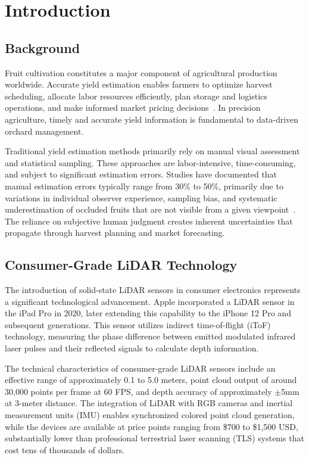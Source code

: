 \section{Introduction}

\subsection{Background}
Fruit cultivation constitutes a major component of agricultural production worldwide. Accurate yield estimation enables farmers to optimize harvest scheduling, allocate labor resources efficiently, plan storage and logistics operations, and make informed market pricing decisions~\citep{Maheswari_2021}. In precision agriculture, timely and accurate yield information is fundamental to data-driven orchard management.

Traditional yield estimation methods primarily rely on manual visual assessment and statistical sampling. These approaches are labor-intensive, time-consuming, and subject to significant estimation errors. Studies have documented that manual estimation errors typically range from 30\% to 50\%, primarily due to variations in individual observer experience, sampling bias, and systematic underestimation of occluded fruits that are not visible from a given viewpoint~\citep{Sa_2016}. The reliance on subjective human judgment creates inherent uncertainties that propagate through harvest planning and market forecasting.

\subsection{Consumer-Grade LiDAR Technology}
The introduction of solid-state LiDAR sensors in consumer electronics represents a significant technological advancement. Apple incorporated a LiDAR sensor in the iPad Pro in 2020, later extending this capability to the iPhone 12 Pro and subsequent generations. This sensor utilizes indirect time-of-flight (iToF) technology, measuring the phase difference between emitted modulated infrared laser pulses and their reflected signals to calculate depth information.

The technical characteristics of consumer-grade LiDAR sensors include an effective range of approximately 0.1 to 5.0 meters, point cloud output of around 30,000 points per frame at 60 FPS, and depth accuracy of approximately $\pm$5mm at 3-meter distance. The integration of LiDAR with RGB cameras and inertial measurement units (IMU) enables synchronized colored point cloud generation, while the devices are available at price points ranging from \$700 to \$1,500 USD, substantially lower than professional terrestrial laser scanning (TLS) systems that cost tens of thousands of dollars.

